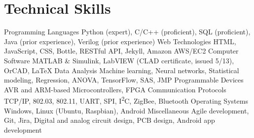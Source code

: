 \section{Technical Skills}
\begin{cvskills}
  \cvskill
    {Programming Languages}
    {Python (expert), C/C++ (proficient), SQL (proficient), Java (prior experience), Verilog (prior experience)}
  \cvskill
    {Web Technologies}
    {HTML, JavaScript, CSS, Bottle, RESTful API, Jekyll, Amazon AWS/EC2}
  \cvskill
    {Computer Software}
    {MATLAB \& Simulink, LabVIEW (CLAD certificate, issued 5/13), OrCAD, \LaTeX}
  \cvskill
    {Data Analysis}
    {Machine learning, Neural networks, Statistical modeling, Regression, ANOVA, TensorFlow, SAS, JMP}
  \cvskill
    {Programmable Devices}
    {AVR and ARM-based Microcontrollers, FPGA}
  \cvskill
    {Communication Protocols}
    {TCP/IP, 802.03, 802.11, UART, SPI, I\textsuperscript{2}C, ZigBee, Bluetooth}
  \cvskill
    {Operating Systems}
    {Windows, Linux (Ubuntu, Raspbian), Android}
  \cvskill
    {Miscellaneous}
    {Agile development, Git, Jira, Digital and analog circuit design, PCB design, Android app development}
\end{cvskills} 